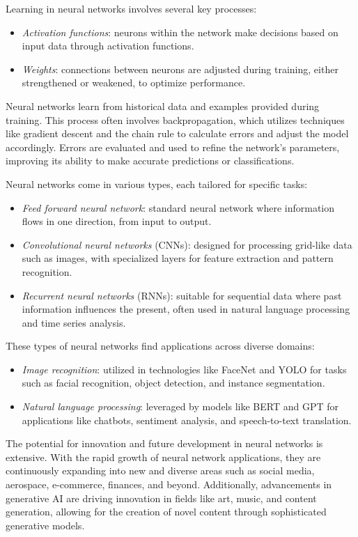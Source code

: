 Learning in neural networks involves several key processes:
\begin{itemize}
    \item \textit{Activation functions}: neurons within the network make decisions based on input data through activation functions.
    \item \textit{Weights}: connections between neurons are adjusted during training, either strengthened or weakened, to optimize performance.
\end{itemize}
Neural networks learn from historical data and examples provided during training. 
This process often involves backpropagation, which utilizes techniques like gradient descent and the chain rule to calculate errors and adjust the model accordingly. 
Errors are evaluated and used to refine the network's parameters, improving its ability to make accurate predictions or classifications. 

Neural networks come in various types, each tailored for specific tasks:
\begin{itemize}
    \item \textit{Feed forward neural network}: standard neural network where information flows in one direction, from input to output.
    \item \textit{Convolutional neural networks} (CNNs): designed for processing grid-like data such as images, with specialized layers for feature extraction and pattern recognition.
    \item \textit{Recurrent neural networks} (RNNs): suitable for sequential data where past information influences the present, often used in natural language processing and time series analysis.
\end{itemize}
These types of neural networks find applications across diverse domains:
\begin{itemize}
    \item \textit{Image recognition}: utilized in technologies like FaceNet and YOLO for tasks such as facial recognition, object detection, and instance segmentation.
    \item \textit{Natural language processing}: leveraged by models like BERT and GPT for applications like chatbots, sentiment analysis, and speech-to-text translation.
\end{itemize}
The potential for innovation and future development in neural networks is extensive. 
With the rapid growth of neural network applications, they are continuously expanding into new and diverse areas such as social media, aerospace, e-commerce, finances, and beyond. 
Additionally, advancements in generative AI are driving innovation in fields like art, music, and content generation, allowing for the creation of novel content through sophisticated generative models.

